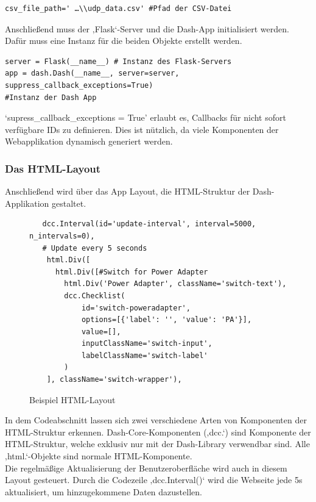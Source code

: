 \begin{verbatim}
csv_file_path=' …\\udp_data.csv' #Pfad der CSV-Datei
\end{verbatim}
Anschließend muss der ‚Flask‘-Server und die Dash-App initialisiert werden. Dafür muss eine Instanz für die beiden Objekte erstellt werden. 
\begin{verbatim}
server = Flask(__name__) # Instanz des Flask-Servers
app = dash.Dash(__name__, server=server, suppress_callback_exceptions=True)
#Instanz der Dash App
\end{verbatim}
‘supress\_callback\_exceptions = True’ erlaubt es, Callbacks für nicht sofort verfügbare IDs zu definieren. Dies ist nützlich, da viele Komponenten der Webapplikation dynamisch generiert werden. 
\newpage
\subsubsection{Das HTML-Layout}\label{sec: html layout}
Anschließend wird über das App Layout, die HTML-Struktur der Dash-Applikation gestaltet. \\
\vspace{3mm}
\begin{figure}[H]
    \centering
    \begin{verbatim}
   dcc.Interval(id='update-interval', interval=5000, n_intervals=0), 
   # Update every 5 seconds
    html.Div([
      html.Div([#Switch for Power Adapter
        html.Div('Power Adapter', className='switch-text'),
        dcc.Checklist(
            id='switch-poweradapter',
            options=[{'label': '', 'value': 'PA'}],
            value=[],
            inputClassName='switch-input',  
            labelClassName='switch-label'
        )
    ], className='switch-wrapper'),
    \end{verbatim}
    \caption{Beispiel HTML-Layout}
\end{figure}
In dem Codeabschnitt lassen sich zwei verschiedene Arten von Komponenten der HTML-Struktur erkennen. Dash-Core-Komponenten (‚dcc.‘) sind Komponente der HTML-Struktur, welche exklusiv nur mit der Dash-Library verwendbar sind. Alle ‚html.‘-Objekte sind normale HTML-Komponente.\\
\vspace{3mm}
Die regelmäßige Aktualisierung der Benutzeroberfläche wird auch in diesem Layout gesteuert. Durch die Codezeile ‚dcc.Interval()‘ wird die Webseite jede 5s aktualisiert, um hinzugekommene Daten dazustellen.\\
